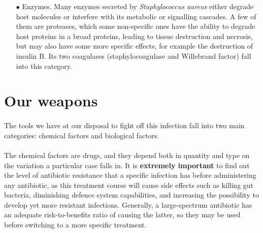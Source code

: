 \begin{itemize}
\item[$\bullet$] Enzymes. Many enzymes secreted by \emph{Staphylococcus aureus} either degrade host molecules or interfere with its metabolic or signalling cascades. A few of them are proteases, which some non-specific ones have the ability to degrade host proteins in a broad proteins, leading to tissue destruction and necrosis, but may also have some more specific effects, for example the destruction of insulin B. Its two coagulases (staphylocoagulase and Willebrand factor) fall into this category.
\end{itemize}
\section{Our weapons}
\paragraph{} The tools we have at our disposal to fight off this infection fall into two main categories: chemical factors and biological factors.
\paragraph{} The chemical factors are drugs, and they depend both in quantity and type on the variation a particular case falls in. It is \textbf{extremely important} to find out the level of antibiotic resistance that a specific infection has before administering any antibiotic, as this treatment course will cause side effects such as killing gut bacteria, diminishing defence system capabilities, and increasing the possibility to develop yet more resistant infections. Generally, a large-spectrum antibiotic has an adequate risk-to-benefits ratio of causing the latter, so they may be used before switching to a more specific treatment.
